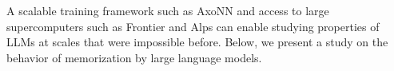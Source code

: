 
A scalable training framework such as AxoNN and access to large supercomputers
such as Frontier and Alps can enable studying properties of LLMs at scales that
were impossible before. Below, we present a study on the behavior of
memorization by large language models.

